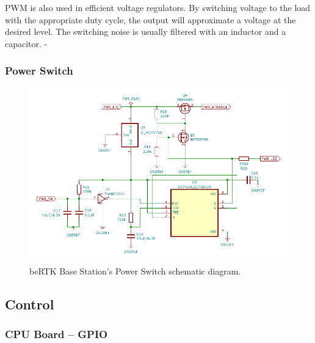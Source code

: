 PWM is also used in efficient voltage regulators. By switching voltage to the load with the appropriate duty cycle, the output will approximate a voltage at the desired level. The switching noise is usually filtered with an inductor and a capacitor. - %

\subsubsection{Power Switch}\label{sec:3214_SWITCH}

\begin{figure}[h]
	\centering
	\includegraphics[width=1.0\textwidth]{Chapters/Figures/chapter3/Power_Switch.pdf}
	\caption{beRTK\textsuperscript{\textregistered} Base Station's Power Switch schematic diagram.}
	\label{fig:SWITCH_circuit}
\end{figure}

\subsection{Control}\label{sec:322_CONTROL}

\subsubsection{CPU Board -- GPIO}\label{sec:3221_CM4_GPIO}

